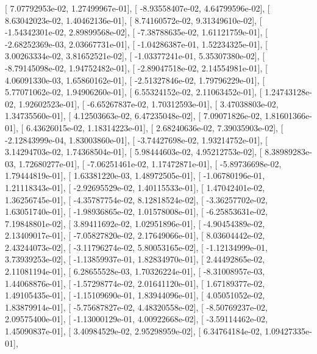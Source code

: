 \documentclass{article}
\begin{document}
       [  7.07792953e-02,   1.27499967e-01],
       [ -8.93558407e-02,   4.64799596e-02],
       [  8.63042023e-02,   1.40462136e-01],
       [  8.74160572e-02,   9.31349610e-02],
       [ -1.54342301e-02,   2.89899568e-02],
       [ -7.38788635e-02,   1.61121759e-01],
       [ -2.68252369e-03,   2.03667731e-01],
       [ -1.04286387e-01,   1.52234325e-01],
       [  3.00263334e-02,   3.81652521e-02],
       [ -1.03377241e-01,   5.35307380e-02],
       [ -8.79145098e-02,   1.94752482e-01],
       [ -2.89047518e-02,   2.14554981e-01],
       [  4.06091330e-03,   1.65860162e-01],
       [ -2.51327846e-02,   1.79796229e-01],
       [  5.77071062e-02,   1.94906260e-01],
       [  6.55324152e-02,   2.11063452e-01],
       [  1.24743128e-02,   1.92602523e-01],
       [ -6.65267837e-02,   1.70312593e-01],
       [  3.47038803e-02,   1.34735560e-01],
       [  4.12503663e-02,   6.47235048e-02],
       [  7.09071826e-02,   1.81601366e-01],
       [  6.43626015e-02,   1.18314223e-01],
       [  2.68240636e-02,   7.39035903e-02],
       [ -2.12843999e-04,   1.83003860e-01],
       [ -3.74427698e-02,   1.93214752e-01],
       [  3.14294703e-02,   1.74368504e-01],
       [  5.98444603e-02,   4.95212753e-02],
       [  8.38989283e-03,   1.72680277e-01],
       [ -7.06251461e-02,   1.17472871e-01],
       [ -5.89736698e-02,   1.79444819e-01],
       [  1.63381220e-03,   1.48972505e-01],
       [ -1.06780196e-01,   1.21118343e-01],
       [ -2.92695529e-02,   1.40115533e-01],
       [  1.47042401e-02,   1.36256745e-01],
       [ -4.35787754e-02,   8.12818524e-02],
       [ -3.36257702e-02,   1.63051740e-01],
       [ -1.98936865e-02,   1.01578008e-01],
       [ -6.25853631e-02,   7.19848801e-02],
       [  3.89411692e-02,   1.02951896e-01],
       [ -4.90454389e-02,   2.13409017e-01],
       [ -7.05827820e-02,   2.17649066e-01],
       [  8.03604442e-02,   2.43244073e-02],
       [ -3.11796274e-02,   5.80053165e-02],
       [ -1.12134999e-01,   3.73939253e-02],
       [ -1.13859937e-01,   1.82834970e-01],
       [  2.44492865e-02,   2.11081194e-01],
       [  6.28655528e-03,   1.70326224e-01],
       [ -8.31008957e-03,   1.44068876e-01],
       [ -1.57298774e-02,   2.01641120e-01],
       [  1.67189377e-02,   1.49105435e-01],
       [ -1.15109690e-01,   1.83944096e-01],
       [  4.05051052e-02,   1.83879914e-01],
       [ -5.75687827e-02,   4.48320558e-02],
       [ -8.50769237e-02,   2.09575400e-01],
       [ -1.13000129e-01,   4.00922668e-02],
       [ -3.59114462e-02,   1.45090837e-01],
       [  3.40984529e-02,   2.95298959e-02],
       [  6.34764184e-02,   1.09427335e-01],
\end{document}

